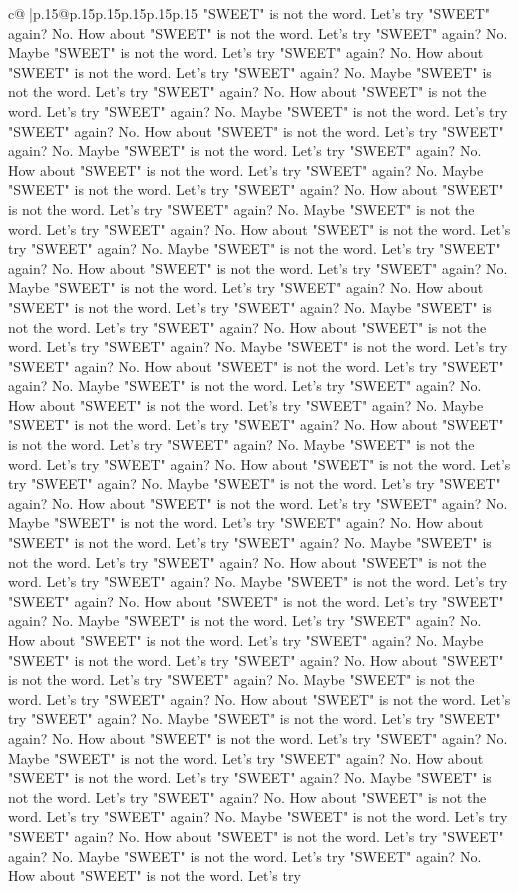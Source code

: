 \documentclass{article}
\begin{document}
{\begin{supertabular}{c@{$\;$}|p{.15\linewidth}@{}p{.15\linewidth}p{.15\linewidth}p{.15\linewidth}p{.15\linewidth}p{.15\linewidth}}
{{{"SWEET" is not the word. Let's try "SWEET" again? No. How about "SWEET" is not the word. Let's try "SWEET" again? No. Maybe "SWEET" is not the word. Let's try "SWEET" again? No. How about "SWEET" is not the word. Let's try "SWEET" again? No. Maybe "SWEET" is not the word. Let's try "SWEET" again? No. How about "SWEET" is not the word. Let's try "SWEET" again? No. Maybe "SWEET" is not the word. Let's try "SWEET" again? No. How about "SWEET" is not the word. Let's try "SWEET" again? No. Maybe "SWEET" is not the word. Let's try "SWEET" again? No. How about "SWEET" is not the word. Let's try "SWEET" again? No. Maybe "SWEET" is not the word. Let's try "SWEET" again? No. How about "SWEET" is not the word. Let's try "SWEET" again? No. Maybe "SWEET" is not the word. Let's try "SWEET" again? No. How about "SWEET" is not the word. Let's try "SWEET" again? No. Maybe "SWEET" is not the word. Let's try "SWEET" again? No. How about "SWEET" is not the word. Let's try "SWEET" again? No. Maybe "SWEET" is not the word. Let's try "SWEET" again? No. How about "SWEET" is not the word. Let's try "SWEET" again? No. Maybe "SWEET" is not the word. Let's try "SWEET" again? No. How about "SWEET" is not the word. Let's try "SWEET" again? No. Maybe "SWEET" is not the word. Let's try "SWEET" again? No. How about "SWEET" is not the word. Let's try "SWEET" again? No. Maybe "SWEET" is not the word. Let's try "SWEET" again? No. How about "SWEET" is not the word. Let's try "SWEET" again? No. Maybe "SWEET" is not the word. Let's try "SWEET" again? No. How about "SWEET" is not the word. Let's try "SWEET" again? No. Maybe "SWEET" is not the word. Let's try "SWEET" again? No. How about "SWEET" is not the word. Let's try "SWEET" again? No. Maybe "SWEET" is not the word. Let's try "SWEET" again? No. How about "SWEET" is not the word. Let's try "SWEET" again? No. Maybe "SWEET" is not the word. Let's try "SWEET" again? No. How about "SWEET" is not the word. Let's try "SWEET" again? No. Maybe "SWEET" is not the word. Let's try "SWEET" again? No. How about "SWEET" is not the word. Let's try "SWEET" again? No. Maybe "SWEET" is not the word. Let's try "SWEET" again? No. How about "SWEET" is not the word. Let's try "SWEET" again? No. Maybe "SWEET" is not the word. Let's try "SWEET" again? No. How about "SWEET" is not the word. Let's try "SWEET" again? No. Maybe "SWEET" is not the word. Let's try "SWEET" again? No. How about "SWEET" is not the word. Let's try "SWEET" again? No. Maybe "SWEET" is not the word. Let's try "SWEET" again? No. How about "SWEET" is not the word. Let's try "SWEET" again? No. Maybe "SWEET" is not the word. Let's try "SWEET" again? No. How about "SWEET" is not the word. Let's try "SWEET" again? No. Maybe "SWEET" is not the word. Let's try "SWEET" again? No. How about "SWEET" is not the word. Let's try "SWEET" again? No. Maybe "SWEET" is not the word. Let's try "SWEET" again? No. How about "SWEET" is not the word. Let's try "SWEET" again? No. Maybe "SWEET" is not the word. Let's try "SWEET" again? No. How about "SWEET" is not the word. Let's try "SWEET" again? No. Maybe "SWEET" is not the word. Let's try "SWEET" again? No. How about "SWEET" is not the word. Let's try }}}
\end{supertabular}}
\end{document}
